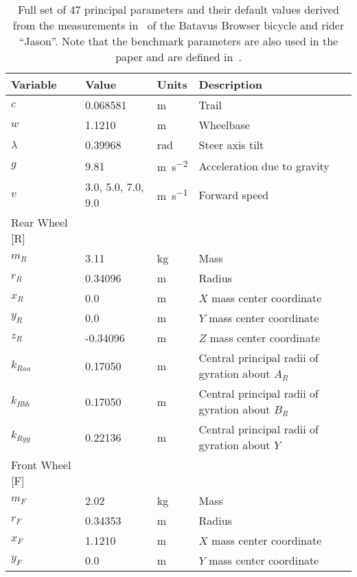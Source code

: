 \documentclass{bmd2019a}
\begin{document}
\begin{table}
  \caption{Full set of 47 principal parameters and their default values derived
    from the measurements in~\cite{Moore2012} of the Batavus Browser bicycle
    and rider ``Jason''. Note that the benchmark parameters are also used in
    the paper and are defined in~\cite{Meijaard2007}.}
  \label{tab:parameters}
  \small
  \centering
  \begin{tabular}{llll}
    \toprule
    Variable & Value & Units & Description \\
    \midrule
    $c$       &  0.068581           & \si{\meter} & Trail \\
    $w$       &  1.1210             & \si{\meter} & Wheelbase \\
    $\lambda$ & 0.39968             & \si{\radian} & Steer axis tilt \\
    $g$       &  9.81               & \si{\meter\per\second\squared} & Acceleration due to gravity \\
    $v$       &  3.0, 5.0, 7.0, 9.0 & \si{\meter\per\second} & Forward speed \\
    Rear Wheel [R] & & \\
    \midrule
    $m_R$     & 3.11 & \si{\kilogram}  & Mass \\
    $r_R$     & 0.34096 & \si{\meter}  & Radius \\
    $x_R$     & 0.0 & \si{\meter}      & $X$ mass center coordinate \\
    $y_R$     & 0.0 & \si{\meter}      & $Y$ mass center coordinate \\
    $z_R$     & -0.34096 & \si{\meter} & $Z$ mass center coordinate \\
    $k_{Raa}$ & 0.17050 & \si{\meter}  & Central principal radii of gyration about $A_R$ \\
    $k_{Rbb}$ & 0.17050 & \si{\meter}  & Central principal radii of gyration about $B_R$ \\
    $k_{Ryy}$ & 0.22136 & \si{\meter}  & Central principal radii of gyration about $Y$ \\
    Front Wheel [F] & & \\
    \midrule
    $m_F$     & 2.02 & \si{\kilogram} & Mass \\
    $r_F$     & 0.34353 & \si{\meter} & Radius \\
    $x_F$     & 1.1210 & \si{\meter} & $X$ mass center coordinate \\
    $y_F$     & 0.0 & \si{\meter} & $Y$ mass center coordinate \\

\end{tabular}
\end{table}
\end{document}
